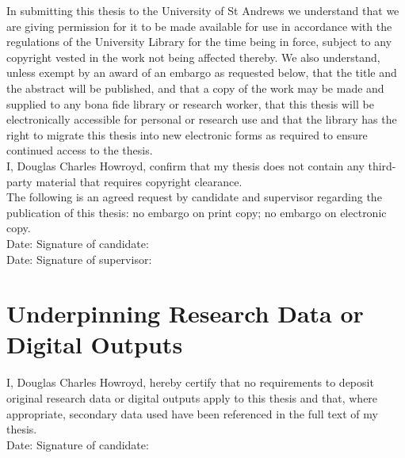 \noindent
In submitting this thesis to the University of St Andrews we understand that we
are giving permission for it to be made available for use in accordance with the
regulations of the University Library for the time being in force, subject to
any copyright vested in the work not being affected thereby. We also understand,
unless exempt by an award of an embargo as requested below, that the title and
the abstract will be published, and that a copy of the work may be made and
supplied to any bona fide library or research worker, that this thesis will be
electronically accessible for personal or research use and that the library has
the right to migrate this thesis into new electronic forms as required to ensure
continued access to the thesis.
\\

\noindent
I, Douglas Charles Howroyd, confirm that my thesis does not contain any third-party
material that requires copyright clearance.
\\

\noindent
The following is an agreed request by candidate and supervisor regarding the
publication of this thesis: no embargo on print copy; no embargo on electronic
copy.
\\

\vspace{1.0em}
\noindent
Date:\makebox[7em]{\dotfill}
Signature of candidate:\dotfill
\\

\vspace{1.0em}
\noindent
Date:\makebox[7em]{\dotfill}
Signature of supervisor:\dotfill
\\

\vspace{-1.3em}
\section*{Underpinning Research Data or Digital Outputs}


I, Douglas Charles Howroyd, hereby certify that no requirements to deposit original
research data or digital outputs apply to this thesis and that, where
appropriate, secondary data used have been referenced in the full text of my
thesis.
\\

\vspace{1.0em}
\noindent
Date:\makebox[7em]{\dotfill}
Signature of candidate:\dotfill
\\

\restoregeometry
